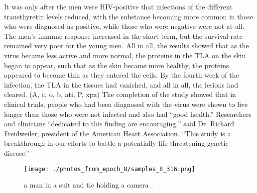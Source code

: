 \documentclass{article}%
\begin{document}
It was only after the men were HIV{-}positive that infections of the different transthyretin levels reduced, with the substance becoming more common in those who were diagnosed as positive, while those who were negative were not at all. The men’s immune response increased in the short{-}term, but the survival rate remained very poor for the young men.\newline%
All in all, the results showed that as the virus became less active and more normal, the proteins in the TLA on the skin began to appear, such that as the skin became more healthy, the proteins appeared to become thin as they entered the cells. By the fourth week of the infection, the TLA in the tissues had vanished, and all in all, the lesions had cleared. (A, c, o, b, ati, P, xpx)\newline%
The completion of the study showed that in clinical trials, people who had been diagnosed with the virus were shown to live longer than those who were not infected and also had “good health.”\newline%
Researchers and clinicians “dedicated to this finding are encouraging,” said Dr. Richard Freidweiler, president of the American Heart Association. “This study is a breakthrough in our efforts to battle a potentially life{-}threatening genetic disease.”\newline%

%


\begin{figure}[h!]%
\centering%
\texttt{[image: ./photos\_from\_epoch\_8/samples\_8\_316.png]}%
\caption{a man in a suit and tie holding a camera .}%
\end{figure}

%
\end{document}
